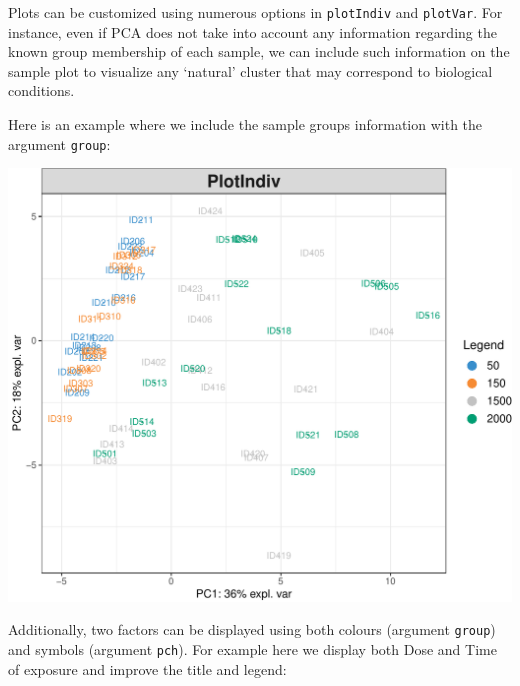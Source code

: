 \documentclass[]{book}
\newenvironment{Shaded}{\begin{snugshade}}{\end{snugshade}}
\newcommand{\DataTypeTok}[1]{\textcolor[rgb]{0.13,0.29,0.53}{#1}}
\newcommand{\KeywordTok}[1]{\textcolor[rgb]{0.13,0.29,0.53}{\textbf{#1}}}
\newcommand{\NormalTok}[1]{#1}
\newcommand{\OperatorTok}[1]{\textcolor[rgb]{0.81,0.36,0.00}{\textbf{#1}}}
\newcommand{\OtherTok}[1]{\textcolor[rgb]{0.56,0.35,0.01}{#1}}
\newcommand{\StringTok}[1]{\textcolor[rgb]{0.31,0.60,0.02}{#1}}
\begin{document}
Plots can be customized using numerous options in \texttt{plotIndiv} and \texttt{plotVar}. For instance, even if PCA does not take into account any information regarding the known group membership of each sample, we can include such information on the sample plot to visualize any `natural' cluster that may correspond to biological conditions.

Here is an example where we include the sample groups information with the argument \texttt{group}:

\begin{Shaded}
\end{Shaded}

\begin{center}\includegraphics[width=0.5\linewidth,]{Figures/03-pca-liver-1-1} \end{center}

Additionally, two factors can be displayed using both colours (argument \texttt{group}) and symbols (argument \texttt{pch}). For example here we display both Dose and Time of exposure and improve the title and legend:

\begin{Shaded}
\end{Shaded}
\end{document}
